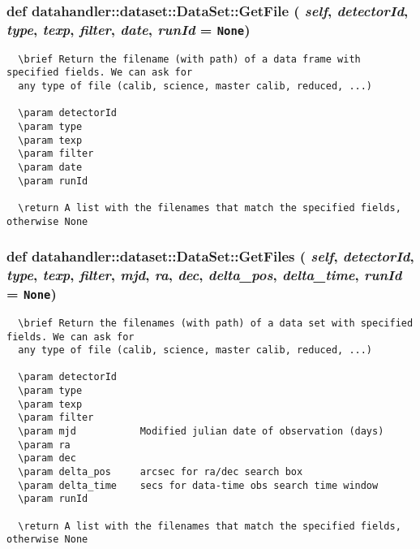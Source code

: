 \subsubsection{\setlength{\rightskip}{0pt plus 5cm}def datahandler::dataset::Data\-Set::Get\-File ( {\em self},  {\em detector\-Id},  {\em type},  {\em texp},  {\em filter},  {\em date},  {\em run\-Id} = {\tt None})}\label{classdatahandler_1_1dataset_1_1DataSet_f347a3e41b4cfa1b5eaf8ec54548086d}




\footnotesize\begin{verbatim}
  \brief Return the filename (with path) of a data frame with specified fields. We can ask for
  any type of file (calib, science, master calib, reduced, ...)

  \param detectorId
  \param type
  \param texp
  \param filter
  \param date
  \param runId

  \return A list with the filenames that match the specified fields, otherwise None
\end{verbatim}
\normalsize
\subsubsection{\setlength{\rightskip}{0pt plus 5cm}def datahandler::dataset::Data\-Set::Get\-Files ( {\em self},  {\em detector\-Id},  {\em type},  {\em texp},  {\em filter},  {\em mjd},  {\em ra},  {\em dec},  {\em delta\_\-pos},  {\em delta\_\-time},  {\em run\-Id} = {\tt None})}\label{classdatahandler_1_1dataset_1_1DataSet_1d59b629d0498948716cc2054f68427e}




\footnotesize\begin{verbatim}
  \brief Return the filenames (with path) of a data set with specified fields. We can ask for
  any type of file (calib, science, master calib, reduced, ...)

  \param detectorId
  \param type
  \param texp
  \param filter
  \param mjd           Modified julian date of observation (days)
  \param ra
  \param dec
  \param delta_pos     arcsec for ra/dec search box
  \param delta_time    secs for data-time obs search time window
  \param runId

  \return A list with the filenames that match the specified fields, otherwise None
\end{verbatim}
\normalsize
